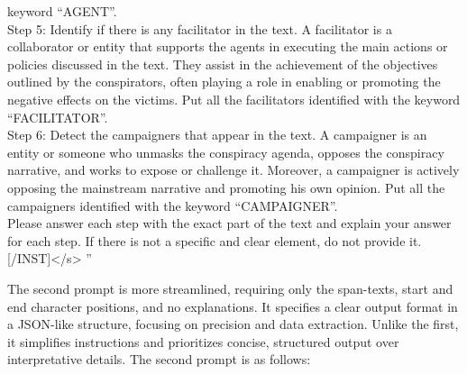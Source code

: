 \documentclass{Configuration_Files/PoliMi3i_thesis}
\begin{document}
\begin{flushleft}
{keyword “AGENT”.\\
Step 5: Identify if there is any facilitator in the text. A facilitator is a collaborator or entity that supports the agents in executing the main actions or policies discussed in the text. They assist in the achievement of the objectives outlined by the conspirators, often playing a role in enabling or promoting the negative effects on the victims. Put all the facilitators identified with the keyword “FACILITATOR”.\\
Step 6: Detect the campaigners that appear in the text. A campaigner is an entity or someone who unmasks the conspiracy agenda, opposes the conspiracy narrative, and works to expose or challenge it. Moreover, a campaigner is actively opposing the mainstream narrative and promoting his own opinion. Put all the campaigners identified with the keyword “CAMPAIGNER”.\\ 
Please answer each step with the exact part of the text and explain your answer for each step. If there is not a specific and clear element, do not provide it.
\mbox{[/INST]</s>} \textquotedblright
}
\end{flushleft}

The second prompt is more streamlined, requiring only the span-texts, start and end character positions, and no explanations. It specifies a clear output format in a JSON-like structure, focusing on precision and data extraction. Unlike the first, it simplifies instructions and prioritizes concise, structured output over interpretative details. The second prompt is as follows:
\end{document}
